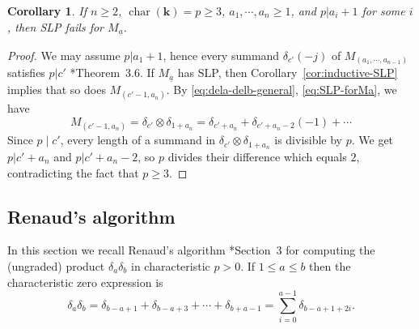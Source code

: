 \documentclass[11pt,reqno]{amsart}
\def\kk{{\mathbf k}}
\newcommand{\oo}{\otimes}
\newcommand{\op}[1]{\operatorname{#1}}
\newcommand{\ul}[1]{\underline{#1}}
\newtheorem{corollary}[theorem]{Corollary}
\theoremstyle{definition}
\theoremstyle{remark}
\numberwithin{equation}{section}
\begin{document}
\begin{corollary}\label{cor:failSLP-pdivis}
    If $n\geq 2$, $\op{char}(\kk)=p\geq 3$, $a_1,\cdots,a_n\geq 1$, and $p|a_i+1$ for some $i$, then SLP fails for $M_{\ul{a}}$.
\end{corollary}

\begin{proof} We may assume $p|a_1+1$, hence every summand $\delta_{c'}(-j)$ of $M_{(a_1,\cdots,a_{n-1})}$ satisfies $p|c'$ \cite{han-monsky}*{Theorem~3.6}. If $M_{\ul{a}}$ has SLP, then Corollary~\ref{cor:inductive-SLP} implies that so does $M_{(c'-1,a_n)}$. By \eqref{eq:dela-delb-general}, \eqref{eq:SLP-forMa}, we have 
\[M_{(c'-1,a_n)} = \delta_{c'}\oo \delta_{1+a_n} = \delta_{c'+a_n}+\delta_{c'+a_n-2}(-1)+\cdots\]
Since $p\mid c'$, every length of a summand in $\delta_{c'}\oo\delta_{1+a_n}$ is divisible by $p$. We get $p|c'+a_n$ and $p|c'+a_n-2$, so $p$ divides their difference which equals $2$, contradicting the fact that $p\geq 3$.    
\end{proof}

\subsection{Renaud's algorithm}
\label{subsec:renaud-algo}

In this section we recall Renaud's algorithm \cite{renaud}*{Section~3} for computing the (ungraded) product $\delta_a\delta_b$ in characteristic $p>0$. If $1\leq a\leq b$ then the characteristic zero expression is
\begin{equation}\label{eq:dela-delb-char0}
\delta_a\delta_b = \delta_{b-a+1}+\delta_{b-a+3}+\cdots+\delta_{b+a-1}=\sum_{i=0}^{a-1} \delta_{b-a+1+2i}.
\end{equation}
\end{document}
